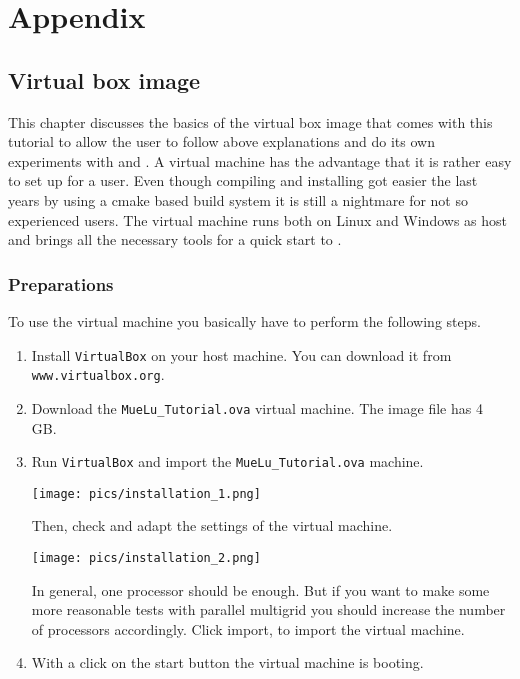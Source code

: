 \documentclass[10pt,fleqn]{book}
\begin{document}
\appendix
\part{Appendix}

\chapter{Virtual box image}

This chapter discusses the basics of the virtual box image that comes with this tutorial to allow the user to follow above explanations and do its own experiments with \muelu and \trilinos. A virtual machine has the advantage that it is rather easy to set up for a user. Even though compiling and installing got easier the last years by using a cmake based build system it is still a nightmare for not so experienced users. The virtual machine runs both on Linux and Windows as host and brings all the necessary tools for a quick start to \muelu.

\section{Preparations}

To use the virtual machine you basically have to perform the following steps.

\begin{enumerate}
\item Install \verb|VirtualBox| on your host machine. You can download it from \verb|www.virtualbox.org|.
\item Download the \verb|MueLu_Tutorial.ova| virtual machine. The image file has 4 GB.
\item Run \verb|VirtualBox| and import the \verb|MueLu_Tutorial.ova| machine.
\begin{center}\texttt{[image: pics/installation\_1.png]} \end{center}
Then, check and adapt the settings of the virtual machine.
\begin{center}\texttt{[image: pics/installation\_2.png]} \end{center}
In general, one processor should be enough. But if you want to make some more reasonable tests with parallel multigrid you should increase the number of processors accordingly.
Click import, to import the virtual machine.
\item With a click on the start button the virtual machine is booting.
\end{enumerate}
\end{document}
